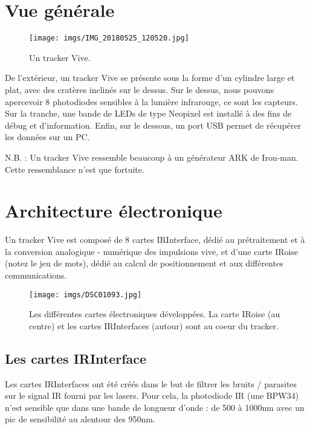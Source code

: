 ﻿\section{Vue générale}

\begin{figure}[ht]
\begin{center}
\texttt{[image: imgs/IMG\_20180525\_120520.jpg]}
\end{center}
\caption{Un tracker Vive.}
\end{figure}

De l'extérieur, un tracker Vive se présente sous la forme d'un cylindre large et plat, avec des cratères inclinés sur le dessus. Sur le dessus, nous pouvons apercevoir 8 photodiodes sensibles à la lumière infrarouge, ce sont les capteurs. Sur la tranche, une bande de LEDs de type Neopixel est installé à des fins de débug et d'information. Enfin, sur le dessous, un port USB permet de récupérer les données sur un PC.

N.B. : Un tracker Vive ressemble beaucoup à un générateur ARK de Iron-man. Cette ressemblance n'est que fortuite.

\section{Architecture électronique}

Un tracker Vive est composé de 8 cartes IRInterface, dédié au prétraitement et à la conversion analogique - numérique des impulsions vive, et d'une carte IRoise (notez le jeu de mots), dédié au calcul de positionnement et aux différentes communications.

\begin{figure}[ht]
\begin{center}
\texttt{[image: imgs/DSC01093.jpg]}
\end{center}
\caption{Les différentes cartes électroniques développées. La carte IRoise (au centre) et les cartes IRInterfaces (autour) sont au coeur du tracker.}
\end{figure}

\subsection{Les cartes IRInterface}

Les cartes IRInterfaces ont été créés dans le but de filtrer les bruits / parasites sur le signal IR fourni par les lasers. Pour cela, la photodiode IR (une BPW34) n'est sensible que dans une bande de longueur d'onde : de 500 à 1000nm avec un pic de sensibilité au alentour des 950nm.

